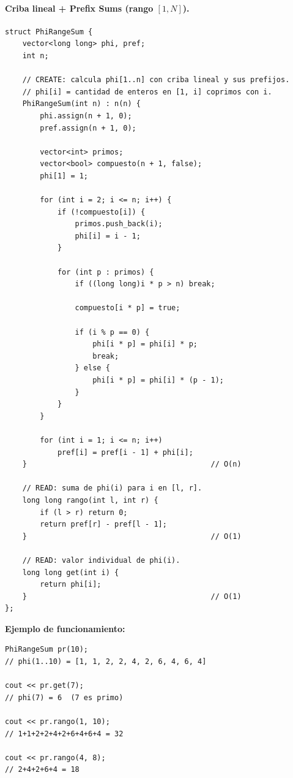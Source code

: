 \documentclass[10pt,a4paper,twocolumn]{article}
\begin{document}
\paragraph{Criba lineal + Prefix Sums (rango $[1,N]$).}

\begin{lstlisting}[style=cpp]
struct PhiRangeSum {
    vector<long long> phi, pref;
    int n;

    // CREATE: calcula phi[1..n] con criba lineal y sus prefijos.
    // phi[i] = cantidad de enteros en [1, i] coprimos con i.
    PhiRangeSum(int n) : n(n) {
        phi.assign(n + 1, 0);
        pref.assign(n + 1, 0);

        vector<int> primos;
        vector<bool> compuesto(n + 1, false);
        phi[1] = 1;

        for (int i = 2; i <= n; i++) {
            if (!compuesto[i]) {
                primos.push_back(i);
                phi[i] = i - 1;
            }

            for (int p : primos) {
                if ((long long)i * p > n) break;

                compuesto[i * p] = true;

                if (i % p == 0) {
                    phi[i * p] = phi[i] * p;
                    break;
                } else {
                    phi[i * p] = phi[i] * (p - 1);
                }
            }
        }

        for (int i = 1; i <= n; i++)
            pref[i] = pref[i - 1] + phi[i];
    }                                          // O(n)

    // READ: suma de phi(i) para i en [l, r].
    long long rango(int l, int r) {
        if (l > r) return 0;
        return pref[r] - pref[l - 1];
    }                                          // O(1)

    // READ: valor individual de phi(i).
    long long get(int i) {
        return phi[i];
    }                                          // O(1)
};
\end{lstlisting}

\textbf{Ejemplo de funcionamiento:}

\begin{lstlisting}[style=cpp]
PhiRangeSum pr(10);
// phi(1..10) = [1, 1, 2, 2, 4, 2, 6, 4, 6, 4]

cout << pr.get(7);
// phi(7) = 6  (7 es primo)

cout << pr.rango(1, 10);
// 1+1+2+2+4+2+6+4+6+4 = 32

cout << pr.rango(4, 8);
// 2+4+2+6+4 = 18
\end{lstlisting}
\end{document}
